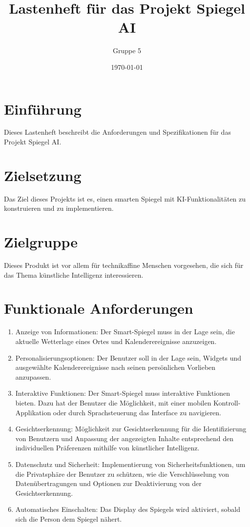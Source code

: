 \documentclass{article}
\title{Lastenheft für das Projekt Spiegel AI}
\author{Gruppe 5}
\date{\today}
\begin{document}
\maketitle

\section{Einführung}
Dieses Lastenheft beschreibt die Anforderungen und Spezifikationen für das Projekt Spiegel AI.

\section{Zielsetzung}
Das Ziel dieses Projekts ist es, einen smarten Spiegel mit KI-Funktionalitäten zu konstruieren und zu implementieren.

\section{Zielgruppe}
Dieses Produkt ist vor allem für technikaffine Menschen vorgesehen, die sich für das Thema künstliche Intelligenz interessieren.

\section{Funktionale Anforderungen}
\begin{enumerate}[label=\textbf{FA\arabic*:}]
    \item Anzeige von Informationen: Der Smart-Spiegel muss in der Lage sein, die aktuelle Wetterlage eines Ortes und Kalenderereignisse anzuzeigen.
    \item Personalisierungsoptionen: Der Benutzer soll in der Lage sein, Widgets und ausgewählte Kalenderereignisse nach seinen persönlichen Vorlieben anzupassen.
    \item Interaktive Funktionen: Der Smart-Spiegel muss interaktive Funktionen bieten. Dazu hat der Benutzer die Möglichkeit, mit einer mobilen Kontroll-Applikation oder durch Sprachsteuerung das Interface zu navigieren.
    \item Gesichtserkennung: Möglichkeit zur Gesichtserkennung für die Identifizierung von Benutzern und Anpassung der angezeigten Inhalte entsprechend den individuellen Präferenzen mithilfe von künstlicher Intelligenz.
    \item Datenschutz und Sicherheit: Implementierung von Sicherheitsfunktionen, um die Privatsphäre der Benutzer zu schützen, wie die Verschlüsselung von Datenübertragungen und Optionen zur Deaktivierung von der Gesichtserkennung.
    \item Automatisches Einschalten: Das Display des Spiegels wird aktiviert, sobald sich die Person dem Spiegel nähert.
\end{enumerate}
\end{document}
